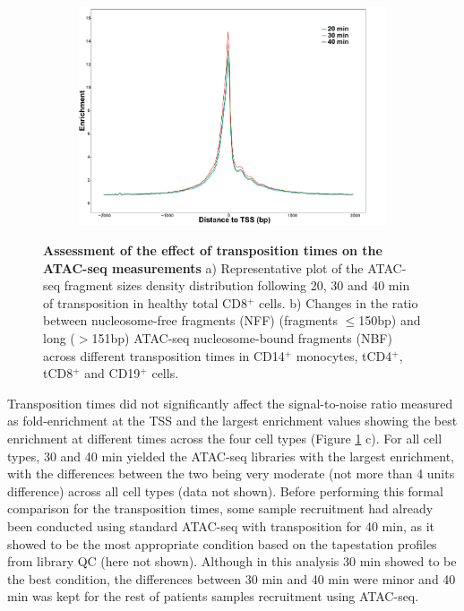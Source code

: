 \begin{figure}[htbp]
\begin{subfigure}{0.5\textwidth}
\centering
\includegraphics[width=\textwidth]{./Results1/pdfs/ATAC_optimisation_CD4_20_30_40_min_tss_enrichment}
\caption{\textbf{}} %
\end{subfigure}
\caption[Assessment of the effect of transposition times on the ATAC-seq measurements]{\textbf{Assessment of the effect of transposition times on the ATAC-seq measurements} a) Representative plot of the ATAC-seq fragment sizes density distribution following 20, 30 and 40 min of transposition in healthy total CD8$^+$ cells. b) Changes in the ratio between nucleosome-free fragments (NFF) (fragments $\leq$150bp) and long ($>$151bp) ATAC-seq nucleosome-bound fragments (NBF) across different transposition times in CD14$^+$ monocytes, tCD4$^+$, tCD8$^+$ and CD19$^+$ cells.}
\label{figure:Transposition_times_ATAC}
\end{figure} 

Transposition times did not significantly affect the signal-to-noise ratio measured as fold-enrichment at the TSS and the largest enrichment values showing the best enrichment at different times across the four cell types (Figure \ref{figure:Transposition_times_ATAC} c). For all cell types, 30 and 40 min yielded the ATAC-seq libraries with the largest enrichment, with the differences between the two being very moderate (not more than 4 units difference) across all cell types (data not shown). Before performing this formal comparison for the transposition times, some sample recruitment had already been conducted using standard ATAC-seq with transposition for 40 min, as it showed to be the most appropriate condition based on the tapestation profiles from library QC (here not shown). Although in this analysis 30 min showed to be the best condition, the differences between 30 min and 40 min were minor and 40 min was kept for the rest of patients samples recruitment using ATAC-seq. 


